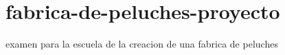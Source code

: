 \chapter{fabrica-\/de-\/peluches-\/proyecto }
\hypertarget{md__r_e_a_d_m_e}{}\label{md__r_e_a_d_m_e}
\label{md__r_e_a_d_m_e_autotoc_md0}%
%


examen para la escuela de la creacion de una fabrica de peluches 